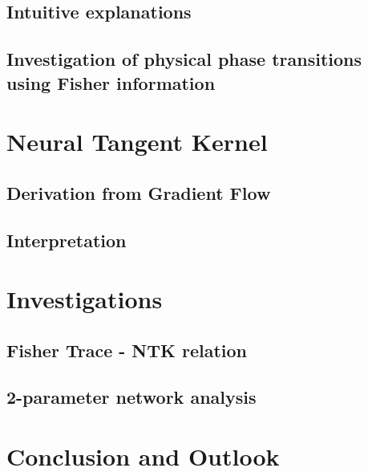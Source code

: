 \documentclass[12pt, twoside, a4paper]{report}
\begin{document}
	\section{Intuitive explanations}\label{sec:FisherInterpretation}
	
	\section{Investigation of physical phase transitions using Fisher information}\label{sec:FIPhysics}
	
	
	
	\chapter{Neural Tangent Kernel}\label{sec:ChapterNTK}
	
	\section{Derivation from Gradient Flow}\label{sec:NTKderivation}
	
	\section{Interpretation}\label{sec:NTKInterpretation}
	
	
	\chapter{Investigations}\label{sec:ChapterResults}
	
	\section{Fisher Trace - NTK relation}\label{sec:Results1}
	
	\section{2-parameter network analysis}\label{sec:Results2}
	
	
	\chapter{Conclusion and Outlook}\label{sec:ChapterConcAndOutlook}
	
	
	
	
\end{document}
